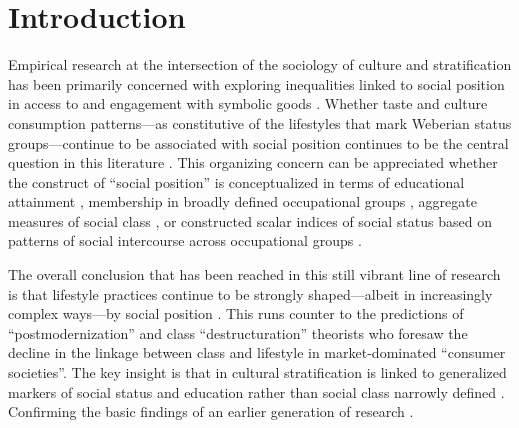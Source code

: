 \documentclass[11pt]{article}
\begin{document}
\newpage
\doublespacing
\section{Introduction} 
Empirical research at the intersection of the sociology of culture and stratification has been primarily concerned  with exploring inequalities linked to social position in access to and engagement with symbolic goods  \citep{dimaggio00, vaneijck00, katzgerro04}.  Whether taste and culture consumption patterns---as constitutive of the lifestyles that mark Weberian status groups---continue to be associated with social position continues to be the central question in this literature \citep{tomlinson03, katzgerro04}.  This organizing concern can be appreciated whether the construct of ``social position'' is conceptualized in terms of educational attainment \citep{bourdieu_darbel91, bryson96, vaneijck99}, membership in broadly defined occupational groups \citep{bourdieu84, dimaggio_useem78a, dimaggio_useem78b, peterson_simkus93, tomlinson03}, aggregate measures of social class \citep{katzgerro_shavit98, katzgerro02, katzgerro06}, or constructed scalar indices of social status based on patterns of social intercourse across occupational groups \citep{chan_goldthorpe05, chan_goldthorpe07a, chan_goldthorpe07b}. 

The overall conclusion that has been reached in this still vibrant line of research is that lifestyle practices continue to be strongly shaped---albeit in increasingly complex ways---by social position \citep{holt98, katzgerro99, tomlinson03, emmison03, warde_etal08}.  This runs counter to the predictions of ``postmodernization'' and class ``destructuration'' theorists who foresaw the decline in the linkage between class and lifestyle in market-dominated ``consumer societies''\citep[e.g.][]{baudrillard06, kingston00, pakulski_waters96}.  The key insight is that in cultural stratification is linked to generalized markers of social status and education rather than social class narrowly defined \citep{alderson_etal07,chan_goldthorpe07a, chan_goldthorpe07b, katzgerro02, katzgerro04, sullivan_katzgerro07, silva06, bennett_etal99, emmison03, ollivier04}. Confirming the basic findings of an earlier generation of research \citep{baumol_bowen66, dimaggio_useem78a, ganzeboom82}.
\end{document}
